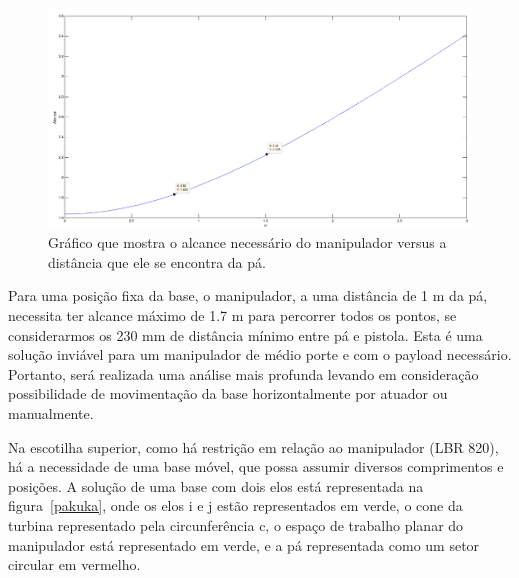 \begin{figure}[h!]
\centering
	\includegraphics[width=\columnwidth]{figs/estudo/geometrico/reach.png} 
	\caption{Gráfico que mostra o alcance necessário do manipulador versus a
	distância que ele se encontra da pá.}
	\label{reach} 
\end{figure}

Para uma posição fixa da base, o manipulador, a uma distância de 1 m
da pá, necessita ter alcance máximo de 1.7 m para percorrer todos os pontos, se
considerarmos os 230 mm de distância mínimo entre pá e pistola. Esta é uma
solução inviável para um manipulador de médio porte e com o payload necessário.
Portanto, será realizada uma análise mais profunda levando em consideração
possibilidade de movimentação da base horizontalmente por atuador ou
manualmente.

Na escotilha superior, como há restrição em relação ao manipulador (LBR 820), há
a necessidade de uma base móvel, que possa assumir diversos comprimentos e
posições. A solução de uma base com dois elos está representada na
figura~\ref{pakuka}, onde os elos i e j estão representados em verde, o cone
da turbina representado pela circunferência c, o espaço de trabalho planar do
manipulador está representado em verde, e a pá representada como um setor
circular em vermelho.

